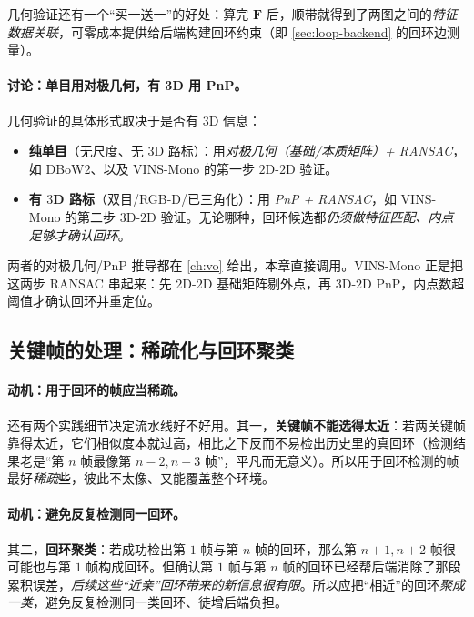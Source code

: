 \noindent 几何验证还有一个“买一送一”的好处\cite{galvez2012bags}：算完 $\mathbf F$ 后，顺带就得到了两图之间的\emph{特征数据关联}，可零成本提供给后端构建回环约束（即 \cref{sec:loop-backend} 的回环边测量）。

\paragraph{讨论：单目用对极几何，有 3D 用 PnP。}
几何验证的具体形式取决于是否有 $3$D 信息\cite{gaoxiang2019slam14}：
\begin{itemize}
  \item \textbf{纯单目}（无尺度、无 $3$D 路标）：用\emph{对极几何（基础/本质矩阵）+ RANSAC}，如 DBoW2、以及 VINS-Mono 的第一步 $2$D-$2$D 验证\cite{qin2018vins}。
  \item \textbf{有 $3$D 路标}（双目/RGB-D/已三角化）：用 \emph{PnP + RANSAC}，如 VINS-Mono 的第二步 $3$D-$2$D 验证。无论哪种，回环候选都\emph{仍须做特征匹配、内点足够才确认回环}\cite{gaoxiang2019slam14}。
\end{itemize}
两者的对极几何/PnP 推导都在 \cref{ch:vo} 给出，本章直接调用。VINS-Mono 正是把这两步 RANSAC 串起来：先 $2$D-$2$D 基础矩阵剔外点，再 $3$D-$2$D PnP，内点数超阈值才确认回环并重定位\cite{qin2018vins}。

\subsection{关键帧的处理：稀疏化与回环聚类}
\label{sec:loop-keyframe}

\paragraph{动机：用于回环的帧应当稀疏。}
还有两个实践细节决定流水线好不好用\cite{gaoxiang2019slam14}。其一，\textbf{关键帧不能选得太近}：若两关键帧靠得太近，它们相似度本就过高，相比之下反而不易检出历史里的真回环（检测结果老是“第 $n$ 帧最像第 $n-2,n-3$ 帧”，平凡而无意义）。所以用于回环检测的帧最好\emph{稀疏}些，彼此不太像、又能覆盖整个环境。

\paragraph{动机：避免反复检测同一回环。}
其二，\textbf{回环聚类}：若成功检出第 $1$ 帧与第 $n$ 帧的回环，那么第 $n+1,n+2$ 帧很可能也与第 $1$ 帧构成回环。但确认第 $1$ 帧与第 $n$ 帧的回环已经帮后端消除了那段累积误差，\emph{后续这些“近亲”回环带来的新信息很有限}。所以应把“相近”的回环\emph{聚成一类}，避免反复检测同一类回环、徒增后端负担\cite{gaoxiang2019slam14}。


